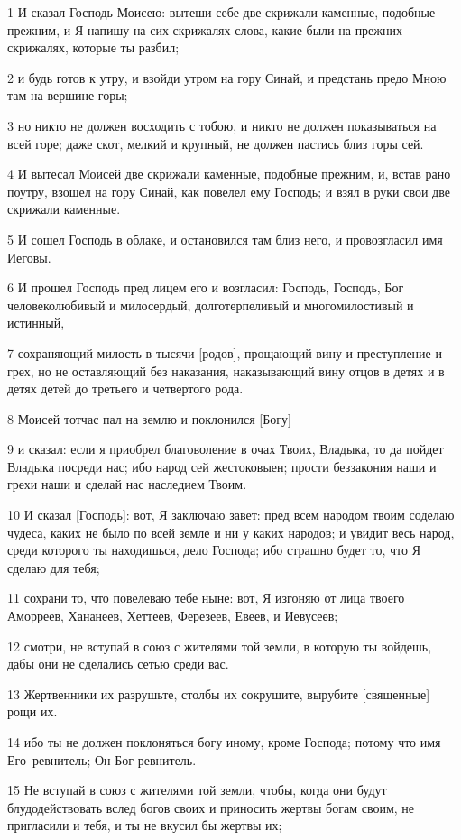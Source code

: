 \par 1 И сказал Господь Моисею: вытеши себе две скрижали каменные, подобные прежним, и Я напишу на сих скрижалях слова, какие были на прежних скрижалях, которые ты разбил;
\par 2 и будь готов к утру, и взойди утром на гору Синай, и предстань предо Мною там на вершине горы;
\par 3 но никто не должен восходить с тобою, и никто не должен показываться на всей горе; даже скот, мелкий и крупный, не должен пастись близ горы сей.
\par 4 И вытесал Моисей две скрижали каменные, подобные прежним, и, встав рано поутру, взошел на гору Синай, как повелел ему Господь; и взял в руки свои две скрижали каменные.
\par 5 И сошел Господь в облаке, и остановился там близ него, и провозгласил имя Иеговы.
\par 6 И прошел Господь пред лицем его и возгласил: Господь, Господь, Бог человеколюбивый и милосердый, долготерпеливый и многомилостивый и истинный,
\par 7 сохраняющий милость в тысячи [родов], прощающий вину и преступление и грех, но не оставляющий без наказания, наказывающий вину отцов в детях и в детях детей до третьего и четвертого рода.
\par 8 Моисей тотчас пал на землю и поклонился [Богу]
\par 9 и сказал: если я приобрел благоволение в очах Твоих, Владыка, то да пойдет Владыка посреди нас; ибо народ сей жестоковыен; прости беззакония наши и грехи наши и сделай нас наследием Твоим.
\par 10 И сказал [Господь]: вот, Я заключаю завет: пред всем народом твоим соделаю чудеса, каких не было по всей земле и ни у каких народов; и увидит весь народ, среди которого ты находишься, дело Господа; ибо страшно будет то, что Я сделаю для тебя;
\par 11 сохрани то, что повелеваю тебе ныне: вот, Я изгоняю от лица твоего Аморреев, Хананеев, Хеттеев, Ферезеев, Евеев, и Иевусеев;
\par 12 смотри, не вступай в союз с жителями той земли, в которую ты войдешь, дабы они не сделались сетью среди вас.
\par 13 Жертвенники их разрушьте, столбы их сокрушите, вырубите [священные] рощи их.
\par 14 ибо ты не должен поклоняться богу иному, кроме Господа; потому что имя Его--ревнитель; Он Бог ревнитель.
\par 15 Не вступай в союз с жителями той земли, чтобы, когда они будут блудодействовать вслед богов своих и приносить жертвы богам своим, не пригласили и тебя, и ты не вкусил бы жертвы их;
